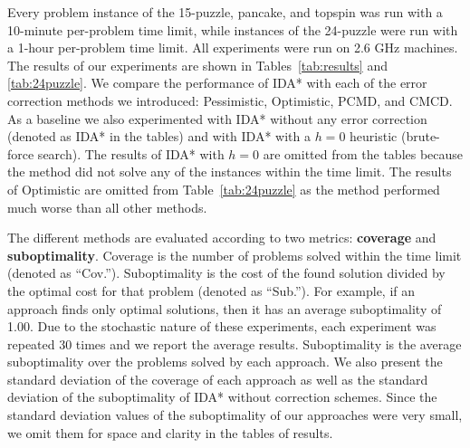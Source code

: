 \documentclass[letterpaper]{article}
\begin{document}
Every problem instance of the 15-puzzle, pancake, and topspin was run with a 10-minute per-problem time limit, while instances of the 24-puzzle were run with a 1-hour per-problem time limit. All experiments were run 
%
%
on 2.6 GHz machines. %
The results of our experiments are shown in Tables~\ref{tab:results} and \ref{tab:24puzzle}. 
%
We compare the performance of IDA* with each of the error correction methods we introduced: Pessimistic, Optimistic, PCMD, and CMCD. As a baseline we also experimented with IDA* without any error correction (denoted as IDA* in the tables) and with IDA* with a $h=0$ heuristic (brute-force search). The results of IDA* with $h=0$ are omitted from the tables because 
the method 
did not solve any of the instances within the time limit. The results of Optimistic are omitted from Table~\ref{tab:24puzzle} as the method performed much worse than all other methods. 

The different methods are evaluated according to two metrics: \textbf{coverage} and \textbf{suboptimality}. Coverage is the number of problems solved within the time limit (denoted as ``Cov.''). 
Suboptimality is the cost of the found solution divided by the optimal cost for that problem (denoted as ``Sub.''). For example, if an approach finds only optimal solutions, then it has an average suboptimality of 1.00.  
%
%
%
Due to the stochastic nature of these experiments, each experiment was repeated 30 times and we report the average results. Suboptimality is the average suboptimality over the problems solved by each approach. We also present the standard deviation of the coverage of each approach as well as the standard deviation of the suboptimality of IDA* without correction schemes. Since the standard deviation values of the suboptimality of our approaches were very small, we omit them for space and clarity in the tables of results. 
\end{document}
